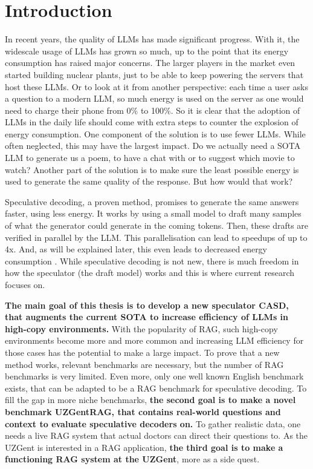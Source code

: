 \chapter{Introduction}
In recent years, the quality of LLMs has made significant progress. With it, the widescale usage of LLMs has grown so much, up to the point that its energy consumption has raised major concerns. The larger players in the market even started building nuclear plants, just to be able to keep powering the servers that host these LLMs. Or to look at it from another perspective: each time a user asks a question to a modern LLM, so much energy is used on the server as one would need to charge their phone from 0\% to 100\%. So it is clear that the adoption of LLMs in the daily life should come with extra steps to counter the explosion of energy consumption. One component of the solution is to use fewer LLMs. While often neglected, this may have the largest impact. Do we actually need a SOTA LLM to generate us a poem, to have a chat with or to suggest which movie to watch? Another part of the solution is to make sure the least possible energy is used to generate the same quality of the response. But how would that work?

Speculative decoding, a proven method, promises to generate the same answers faster, using less energy. It works by using a small model to draft many samples of what the generator could generate in the coming tokens. Then, these drafts are verified in parallel by the LLM. This parallelisation can lead to speedups of up to 4x. And, as will be explained later, this even leads to decreased energy consumption \cite{qin2024optimized}. While speculative decoding is not new, there is much freedom in how the speculator (the draft model) works and this is where current research focuses on.

\textbf{The main goal of this thesis is to develop a new speculator CASD, that augments the current SOTA to increase efficiency of LLMs in high-copy environments.} With the popularity of RAG, such high-copy environments become more and more common and increasing LLM efficiency for those cases has the potential to make a large impact. To prove that a new method works, relevant benchmarks are necessary, but the number of RAG benchmarks is very limited. Even more, only one well known English benchmark exists, that can be adapted to be a RAG benchmark for speculative decoding. To fill the gap in more niche benchmarks, \textbf{the second goal is to make a novel benchmark UZGentRAG, that contains real-world questions and context to evaluate speculative decoders on.} To gather realistic data, one needs a live RAG system that actual doctors can direct their questions to. As the UZGent is interested in a RAG application, \textbf{the third goal is to make a functioning RAG system at the UZGent}, more as a side quest. 


